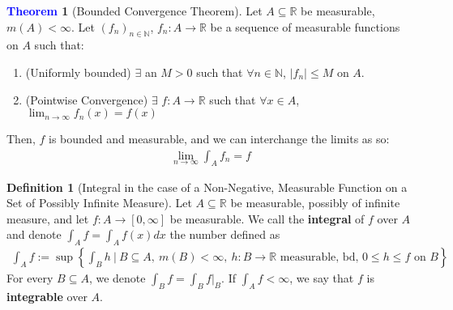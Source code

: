 \documentclass[11pt]{article}
\theoremstyle{definition}
\newcommand{\bb}[1]{\mathbb{#1}}
\newcommand{\sets}[2]{ \left\{ #1\ |\ #2 \right\}}
\newtheorem{theorem}{\textcolor{blue}{Theorem}}
\theoremstyle{definition}
\newtheorem{definition}{\textcolor{OliveGreen}{Definition}}
\theoremstyle{remark}
\begin{document}
\begin{theorem}[Bounded Convergence Theorem]
	Let $A \subseteq \bb{R}$ be measurable, $m(A) < \infty$. Let $(f_n)_{n \in \bb{N}}$, $f_n: A \rightarrow \bb{R}$ be a sequence of measurable functions on $A$ such that: 
	\begin{enumerate}[noitemsep]
		\item (Uniformly bounded) $\exists$ an $M > 0$ such that $\forall n \in \bb{N}$, $|f_n| \leq M$ on $A$. 
		\item (Pointwise Convergence) $\exists$ $f: A \rightarrow \bb{R}$ such that $\forall x \in A$, $\lim_{n \rightarrow \infty} f_n(x) = f(x)$
	\end{enumerate}
	Then, $f$ is bounded and measurable, and we can interchange the limits as so: 
	\begin{align*}
		\lim_{n \rightarrow \infty} \int_A f_n = f	
	\end{align*}
\end{theorem}


\begin{definition}[Integral in the case of a Non-Negative, Measurable Function on a Set of Possibly Infinite Measure] 
	Let $A \subseteq \bb{R}$ be measurable, possibly of infinite measure, and let $f: A \rightarrow [0, \infty]$ be measurable. We call the \textbf{integral} of $f$ over $A$ and denote $\int_A f = \int_A f(x) dx$ the number defined as 
	\begin{align}
		\int_A f := \sup \sets{\int_B h}{B \subseteq A,\ m(B) < \infty,\ h: B \rightarrow \bb{R} \mbox{ measurable, bd, } 0 \leq h \leq f \mbox{ on } B}
	\end{align}
	For every $B \subseteq A$, we denote $\int_B f = \int_B f|_B$. If $\int_A f < \infty$, we say that $f$ is \textbf{integrable} over $A$. 
\end{definition}
\end{document}
